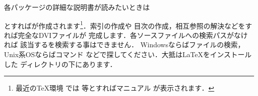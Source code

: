 {各パッケージの詳細な説明書が読みたいときは
\begin{InTerm}
\end{InTerm}
とすればが作成されます\footnote{最近の\TeX 環境
では \underline{}等とすればマニュアル
が表示されます．}．索引の作成や
目次の作成，相互参照の解決などをすれば完全なDVIファイルが
完成します．各ソースファイルへの検索パスがなければ
該当するを検索する事はできません．
{Windows}ならばファイルの検索，Unix系OSならばコマンド
などで探してください．大抵は{\LaTeX}をインストールした
ディレクトリの下にあります．

}

